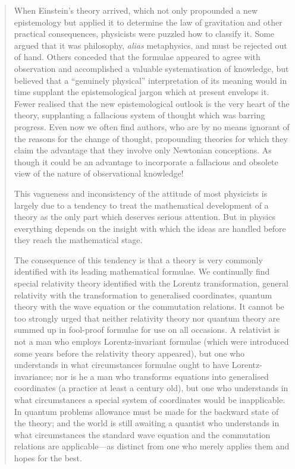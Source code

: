 \begin{quote}
    When Einstein's theory arrived, which not only propounded a new epistemology but applied it to determine the law of gravitation and other practical consequences, physicists were puzzled how to classify it.  Some argued that it was philosophy, \emph{alias} metaphysics, and must be rejected out of hand.  Others conceded that the formulae appeared to agree with observation and accomplished a valuable systematisation of knowledge, but believed that a ``genuinely physical'' interpretation of its meaning would in time supplant the epistemological jargon which at present envelops it.  Fewer realised that the new epistemological outlook is the very heart of the theory, supplanting a fallacious system of thought which was barring progress.  Even now we often find authors, who are by no means ignorant of the reasons for the change of thought, propounding theories for which they claim the advantage that they involve only Newtonian conceptions.  As though it could be an advantage to incorporate a fallacious and obsolete view of the nature of observational knowledge!
    
    This vagueness and inconsistency of the attitude of most physicists is largely due to a tendency to treat the mathematical development of a theory as the only part which deserves serious attention.  But in physics everything depends on the insight with which the ideas are handled before they reach the mathematical stage.
    
    The consequence of this tendency is that a theory is very commonly identified with its leading mathematical formulae.  We continually find special relativity theory identified with the Lorentz transformation, general relativity with the transformation to generalised coordinates, quantum theory with the wave equation or the commutation relations.  It cannot be too strongly urged that neither relativity theory nor quantum theory are summed up in fool-proof formulae for use on all occasions.  A relativist is not a man who employs Lorentz-invariant formulae (which were introduced some years before the relativity theory appeared), but one who understands in what circumstances formulae ought to have Lorentz-invariance; nor is he a man who transforms equations into generalised coordinates (a practice at least a century old), but one who understands in what circumstances a special system of coordinates would be inapplicable.  In quantum problems allowance must be made for the backward state of the theory; and the world is still awaiting a quantist who understands in what circumstances the standard wave equation and the commutation relations are applicable---as distinct from one who merely applies them and hopes for the best.
    
    \citep[p. 55-56]{Eddington1939}
\end{quote}

